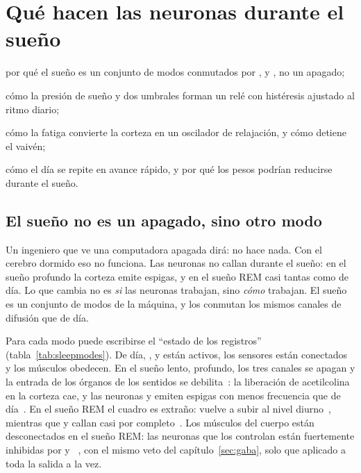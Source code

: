 \chapter{Qué hacen las neuronas durante el sueño}
\label{sec:sleep}
\begin{chaptergoals}
\item por qué el sueño es un conjunto de modos conmutados por ,  y , no un apagado;
\item cómo la presión de sueño y dos umbrales forman un relé con histéresis ajustado al ritmo diario;
\item cómo la fatiga convierte la corteza en un oscilador de relajación, y cómo  detiene el vaivén;
\item cómo el día se repite en avance rápido, y por qué los pesos podrían reducirse durante el sueño.
\end{chaptergoals}

\section{El sueño no es un apagado, sino otro modo}

Un ingeniero que ve una computadora apagada dirá: no hace nada. Con el cerebro dormido eso no funciona. Las neuronas no callan durante el sueño: en el sueño profundo la corteza emite espigas, y en el sueño REM casi tantas como de día. Lo que cambia no es \emph{si} las neuronas trabajan, sino \emph{cómo} trabajan. El sueño es un conjunto de modos de la máquina, y los conmutan los mismos canales de difusión que de día.

Para cada modo puede escribirse el “estado de los registros” (tabla~\ref{tab:sleepmodes}). De día, ,  y  están activos, los sensores están conectados y los músculos obedecen. En el sueño lento, profundo, los tres canales se apagan y la entrada de los órganos de los sentidos se debilita~\cite{Hasselmo1999}: la liberación de acetilcolina en la corteza cae, y las neuronas  y  emiten espigas con menos frecuencia que de día~\cite{Marrosu1995,AstonJonesBloom1981,McGintyHarper1976}. En el sueño REM el cuadro es extraño:  vuelve a subir al nivel diurno~\cite{Marrosu1995}, mientras que  y  callan casi por completo~\cite{AstonJonesBloom1981,McGintyHarper1976,JacobsAzmitia1992}. Los músculos del cuerpo están desconectados en el sueño REM: las neuronas  que los controlan están fuertemente inhibidas por  y ~\cite{BrooksPeever2012}, con el mismo veto del capítulo~\ref{sec:gaba}, solo que aplicado a toda la salida a la vez.

